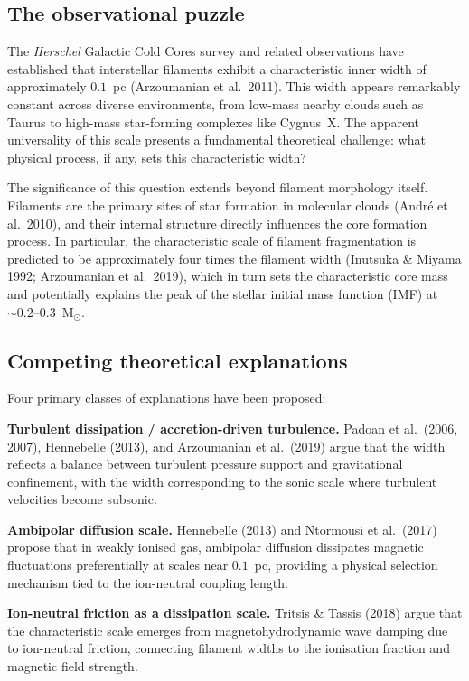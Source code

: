 \documentclass{mnras}
\begin{document}
\subsection{The observational puzzle}

The \textit{Herschel} Galactic Cold Cores survey and related observations have established that interstellar filaments exhibit a characteristic inner width of approximately $0.1$~pc (Arzoumanian et al.~2011). This width appears remarkably constant across diverse environments, from low-mass nearby clouds such as Taurus to high-mass star-forming complexes like Cygnus~X. The apparent universality of this scale presents a fundamental theoretical challenge: what physical process, if any, sets this characteristic width?

The significance of this question extends beyond filament morphology itself. Filaments are the primary sites of star formation in molecular clouds (Andr\'e et al.~2010), and their internal structure directly influences the core formation process. In particular, the characteristic scale of filament fragmentation is predicted to be approximately four times the filament width (Inutsuka \& Miyama 1992; Arzoumanian et al.~2019), which in turn sets the characteristic core mass and potentially explains the peak of the stellar initial mass function (IMF) at $\sim0.2$--$0.3$~M$_\odot$.

\subsection{Competing theoretical explanations}

Four primary classes of explanations have been proposed:

\textbf{Turbulent dissipation / accretion-driven turbulence.} Padoan et al.~(2006, 2007), Hennebelle (2013), and Arzoumanian et al.~(2019) argue that the width reflects a balance between turbulent pressure support and gravitational confinement, with the width corresponding to the sonic scale where turbulent velocities become subsonic.

\textbf{Ambipolar diffusion scale.} Hennebelle (2013) and Ntormousi et al.~(2017) propose that in weakly ionised gas, ambipolar diffusion dissipates magnetic fluctuations preferentially at scales near $0.1$~pc, providing a physical selection mechanism tied to the ion-neutral coupling length.

\textbf{Ion-neutral friction as a dissipation scale.} Tritsis \& Tassis (2018) argue that the characteristic scale emerges from magnetohydrodynamic wave damping due to ion-neutral friction, connecting filament widths to the ionisation fraction and magnetic field strength.
\end{document}
